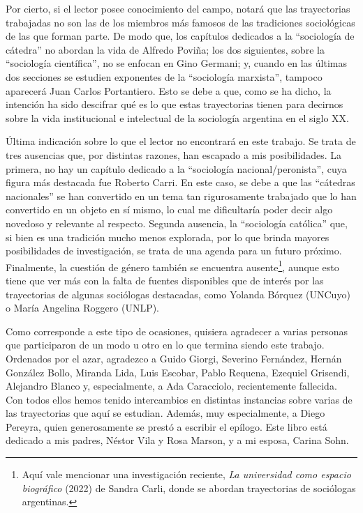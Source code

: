 Por cierto, si el lector posee conocimiento del campo, notará que las trayectorias trabajadas no son las de los miembros más famosos de las tradiciones sociológicas de las que forman parte. De modo que, los capítulos dedicados a la ``sociología de cátedra'' no abordan la vida de Alfredo Poviña; los dos siguientes, sobre la ``sociología científica'', no se enfocan en Gino Germani; y, cuando en las últimas dos secciones se estudien exponentes de la ``sociología marxista'', tampoco aparecerá Juan Carlos Portantiero. Esto se debe a que, como se ha dicho, la intención ha sido descifrar qué es lo que estas trayectorias tienen para decirnos sobre la vida institucional e intelectual de la sociología argentina en el siglo XX.

Última indicación sobre lo que el lector no encontrará en este trabajo. Se trata de tres ausencias que, por distintas razones, han escapado a mis posibilidades. La primera, no hay un capítulo dedicado a la ``sociología nacional/peronista'', cuya figura más destacada fue Roberto Carri. En este caso, se debe a que las ``cátedras nacionales'' se han convertido en un tema tan rigurosamente trabajado que lo han convertido en un objeto en sí mismo, lo cual me dificultaría poder decir algo novedoso y relevante al respecto. Segunda ausencia, la ``sociología católica'' que, si bien es una tradición mucho menos explorada, por lo que brinda mayores posibilidades de investigación, se trata de una agenda para un futuro próximo. Finalmente, la cuestión de género también se encuentra ausente\footnote{Aquí vale mencionar una investigación reciente, \emph{La universidad como espacio biográfico} (2022) de Sandra Carli, donde se abordan trayectorias de sociólogas argentinas.}, aunque esto tiene que ver más con la falta de fuentes disponibles que de interés por las trayectorias de algunas sociólogas destacadas, como Yolanda Bórquez (UNCuyo) o María Angelina Roggero (UNLP).

\froufrou

Como corresponde a este tipo de ocasiones, quisiera agradecer a varias personas que participaron de un modo u otro en lo que termina siendo este trabajo. Ordenados por el azar, agradezco a Guido Giorgi, Severino Fernández, Hernán González Bollo, Miranda Lida, Luis Escobar, Pablo Requena, Ezequiel Grisendi, Alejandro Blanco y, especialmente, a Ada Caracciolo, recientemente fallecida. Con todos ellos hemos tenido intercambios en distintas instancias sobre varias de las trayectorias que aquí se estudian. Además, muy especialmente, a Diego Pereyra, quien generosamente se prestó a escribir el epílogo. Este libro está dedicado a mis padres, Néstor Vila y Rosa Marson, y a mi esposa, Carina Sohn.

